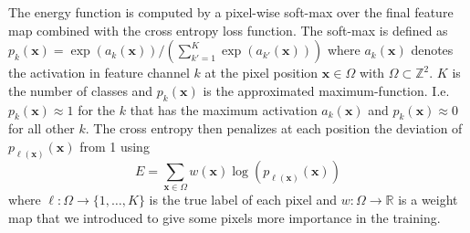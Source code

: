 \documentclass{llncs}
\renewcommand{\vec}[1]{\boldsymbol{\mathbf{#1}}}
\begin{document}
The energy function is computed by a pixel-wise soft-max over the final feature map combined with the cross entropy loss function. The soft-max  is defined as ${p}_k(\vec{x}) = \exp({a_k(\vec{x})}) / \left(\sum_{k' = 1}^K \exp(a_{k'}(\vec{x}))\right)$
where $a_k(\vec{x})$ denotes the activation in feature channel $k$ at the pixel position $\vec{x} \in \Omega$ with $\Omega \subset \mathbb{Z}^2$. $K$ is the number of classes and ${p}_k(\vec{x})$ is the approximated maximum-function. I.e. ${p}_k(\vec{x}) \approx 1$ for the $k$ that has the maximum activation $a_k(\vec{x})$ and ${p}_k(\vec{x}) \approx 0$ for all other $k$. The cross entropy then penalizes at each position the deviation of ${p}_{\ell(\vec{x})}(\vec{x})$ from 1 using
\begin{equation}
  E = \sum_{\vec{x} \in \Omega} w(\vec{x}) \log({p}_{\ell(\vec{x})}(\vec{x}))
\end{equation}
where $\ell:\Omega \rightarrow \{1,\dots,K\}$ is the true label of each pixel and $w:\Omega \rightarrow \mathds{R}$ is a weight map that we introduced to give some pixels more importance in the training.
\end{document}
